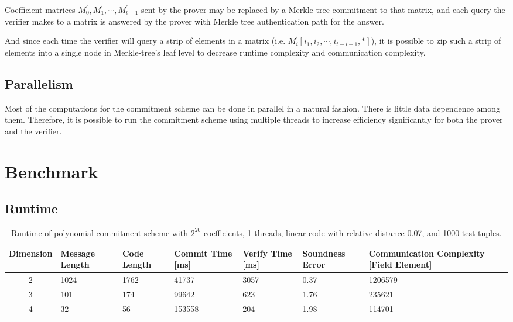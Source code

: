 Coefficient matrices $M_0^\prime, M_1^\prime, \cdots, M_{t-1}^\prime$ sent by the prover may be replaced by a Merkle tree commitment to that matrix, and each query the verifier makes to a matrix is answered by the prover with Merkle tree authentication path for the answer.

And since each time the verifier will query a strip of elements in a matrix (i.e. $M_i^\prime[i_1, i_2, \cdots, i_{t-i-1}, *]$), it is possible to zip such a strip of elements into a single node in Merkle-tree's leaf level to decrease runtime complexity and communication complexity.

\subsection{Parallelism}

Most of the computations for the commitment scheme can be done in parallel in a natural fashion. There is little data dependence among them. Therefore, it is possible to run the commitment scheme using multiple threads to increase efficiency significantly for both the prover and the verifier.


\section{Benchmark}

\subsection{Runtime}


\begin{table}[h!]
\centering
\begin{tabular}{| c | m{4em}  | m{3em}  | m{3.5em} | m{2.5em} | m{5em} | m{7em} |} 
 \hline
 Dimension & Message Length & Code Length & Commit Time [ms] & Verify Time [ms] & Soundness Error & Communication Complexity [Field Element] \\ [0.5ex] 
 \hline\hline
 2 & 1024   & 1762 & 41737  & 3057  & 0.37 & 1206579 \\
 \hline
 3 & 101    & 174 & 99642  & 623  & 1.76 & 235621  \\
 \hline
 4 & 32     & 56 & 153558  & 204  & 1.98 & 114701   \\
 \hline
\end{tabular}
\caption{Runtime of polynomial commitment scheme with $2^{20}$ coefficients, 1 threads, linear code with relative distance 0.07, and 1000 test tuples.}
\label{table:benchmark-pc-1}
\end{table}


